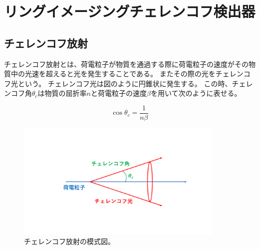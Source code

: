 \section{リングイメージングチェレンコフ検出器}

\subsection{チェレンコフ放射}
チェレンコフ放射とは、荷電粒子が物質を通過する際に荷電粒子の速度がその物質中の光速を超えると光を発生することである。
またその際の光をチェレンコフ光という。
チェレンコフ光は図のように円錐状に発生する。
この時、チェレンコフ角$\theta_{c}$は物質の屈折率$n$と荷電粒子の速度$\beta$を用いて次のように表せる。

\begin{equation}
  \label{cherenkov_angle}
  \cos \theta_{c} = \frac{1}{n\beta}
\end{equation}

\begin{figure}[htbp]
  \centering
  \includegraphics[width=10cm]{images/chapter2/cherenkov.pdf}
  \caption[チェレンコフ放射の模式図]{チェレンコフ放射の模式図。}
  \label{cherenkov}
\end{figure}